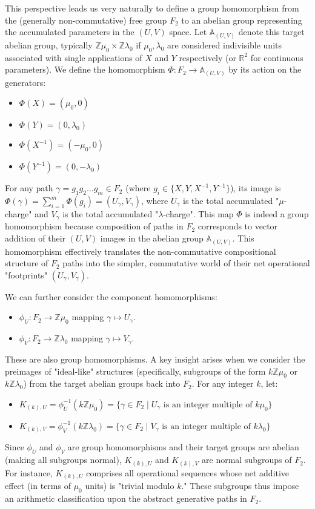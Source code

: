 This perspective leads us very naturally to define a group homomorphism from the (generally non-commutative) free group $F_2$ to an abelian group representing the accumulated parameters in the $(U,V)$ space. Let $\mathbb{A}_{(U,V)}$ denote this target abelian group, typically $\mathbb{Z}\mu_0 \times \mathbb{Z}\lambda_0$ if $\mu_0, \lambda_0$ are considered indivisible units associated with single applications of $X$ and $Y$ respectively (or $\mathbb{R}^2$ for continuous parameters). We define the homomorphism $\Phi: F_2 \to \mathbb{A}_{(U,V)}$ by its action on the generators:
\begin{itemize}
    \item $\Phi(X) = (\mu_0, 0)$
    \item $\Phi(Y) = (0, \lambda_0)$
    \item $\Phi(X^{-1}) = (-\mu_0, 0)$
    \item $\Phi(Y^{-1}) = (0, -\lambda_0)$
\end{itemize}
For any path $\gamma = g_1 g_2 \dots g_m \in F_2$ (where $g_i \in \{X, Y, X^{-1}, Y^{-1}\}$), its image is $\Phi(\gamma) = \sum_{i=1}^m \Phi(g_i) = (U_\gamma, V_\gamma)$, where $U_\gamma$ is the total accumulated "$\mu$-charge" and $V_\gamma$ is the total accumulated "$\lambda$-charge". This map $\Phi$ is indeed a group homomorphism because composition of paths in $F_2$ corresponds to vector addition of their $(U,V)$ images in the abelian group $\mathbb{A}_{(U,V)}$. This homomorphism effectively translates the non-commutative compositional structure of $F_2$ paths into the simpler, commutative world of their net operational "footprints" $(U_\gamma, V_\gamma)$.

We can further consider the component homomorphisms:
\begin{itemize}
    \item $\phi_U: F_2 \to \mathbb{Z}\mu_0$ mapping $\gamma \mapsto U_\gamma$.
    \item $\phi_V: F_2 \to \mathbb{Z}\lambda_0$ mapping $\gamma \mapsto V_\gamma$.
\end{itemize}
These are also group homomorphisms. A key insight arises when we consider the preimages of "ideal-like" structures (specifically, subgroups of the form $k\mathbb{Z}\mu_0$ or $k\mathbb{Z}\lambda_0$) from the target abelian groups back into $F_2$. For any integer $k$, let:
\begin{itemize}
    \item $K_{(k),U} = \phi_U^{-1}(k\mathbb{Z}\mu_0) = \{ \gamma \in F_2 \mid U_\gamma \text{ is an integer multiple of } k\mu_0 \}$
    \item $K_{(k),V} = \phi_V^{-1}(k\mathbb{Z}\lambda_0) = \{ \gamma \in F_2 \mid V_\gamma \text{ is an integer multiple of } k\lambda_0 \}$
\end{itemize}
Since $\phi_U$ and $\phi_V$ are group homomorphisms and their target groups are abelian (making all subgroups normal), $K_{(k),U}$ and $K_{(k),V}$ are normal subgroups of $F_2$. For instance, $K_{(k),U}$ comprises all operational sequences whose net additive effect (in terms of $\mu_0$ units) is "trivial modulo $k$." These subgroups thus impose an arithmetic classification upon the abstract generative paths in $F_2$.

